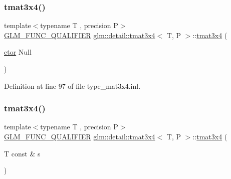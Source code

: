 \mbox{\label{structglm_1_1detail_1_1tmat3x4_a32a8b66fd3ff5ea24c91aa476f2268c7}} 
\subsubsection{\texorpdfstring{tmat3x4()}{tmat3x4()}\hspace{0.1cm}{\footnotesize\ttfamily [4/22]}}
{\footnotesize\ttfamily template$<$typename T , precision P$>$ \\
\hyperlink{setup_8hpp_a33fdea6f91c5f834105f7415e2a64407}{G\+L\+M\+\_\+\+F\+U\+N\+C\+\_\+\+Q\+U\+A\+L\+I\+F\+I\+ER} \hyperlink{structglm_1_1detail_1_1tmat3x4}{glm\+::detail\+::tmat3x4}$<$ T, P $>$\+::\hyperlink{structglm_1_1detail_1_1tmat3x4}{tmat3x4} (\begin{DoxyParamCaption}\item[{\hyperlink{structglm_1_1detail_1_1tmat3x4_aaf0d815b5c79dd7663c3532c8d03ade8}{ctor}}]{Null }\end{DoxyParamCaption})\hspace{0.3cm}{\ttfamily [explicit]}}



Definition at line 97 of file type\+\_\+mat3x4.\+inl.

\mbox{\label{structglm_1_1detail_1_1tmat3x4_ad8bf1b12863045314b88499921fe1e61}} 
\subsubsection{\texorpdfstring{tmat3x4()}{tmat3x4()}\hspace{0.1cm}{\footnotesize\ttfamily [5/22]}}
{\footnotesize\ttfamily template$<$typename T , precision P$>$ \\
\hyperlink{setup_8hpp_a33fdea6f91c5f834105f7415e2a64407}{G\+L\+M\+\_\+\+F\+U\+N\+C\+\_\+\+Q\+U\+A\+L\+I\+F\+I\+ER} \hyperlink{structglm_1_1detail_1_1tmat3x4}{glm\+::detail\+::tmat3x4}$<$ T, P $>$\+::\hyperlink{structglm_1_1detail_1_1tmat3x4}{tmat3x4} (\begin{DoxyParamCaption}\item[{T const \&}]{s }\end{DoxyParamCaption})\hspace{0.3cm}{\ttfamily [explicit]}}



